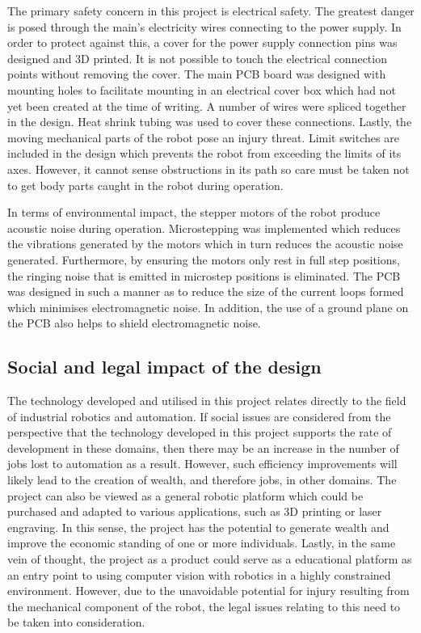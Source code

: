 The primary safety concern in this project is electrical safety. The greatest danger is posed through the main's electricity wires connecting to the power supply. In order to protect against this, a cover for the power supply connection pins was designed and 3D printed. It is not possible to touch the electrical connection points without removing the cover. The main PCB board was designed with mounting holes to facilitate mounting in an electrical cover box which had not yet been created at the time of writing. A number of wires were spliced together in the design. Heat shrink tubing was used to cover these connections. Lastly, the moving mechanical parts of the robot pose an injury threat. Limit switches are included in the design which prevents the robot from exceeding the limits of its axes. However, it cannot sense obstructions in its path so care must be taken not to get body parts caught in the robot during operation.

In terms of environmental impact, the stepper motors of the robot produce acoustic noise during operation. Microstepping was implemented which reduces the vibrations generated by the motors which in turn reduces the acoustic noise generated. Furthermore, by ensuring the motors only rest in full step positions, the ringing noise that is emitted in microstep positions is eliminated. The PCB was designed in such a manner as to reduce the size of the current loops formed which minimises electromagnetic noise. In addition, the use of a ground plane on the PCB also helps to shield electromagnetic noise.

\subsection{Social and legal impact of the design}

The technology developed and utilised in this project relates directly to the field of industrial robotics and automation. If social issues are considered from the perspective that the technology developed in this project supports the rate of development in these domains, then there may be an increase in the number of jobs lost to automation as a result. However, such efficiency improvements will likely lead to the creation of wealth, and therefore jobs, in other domains. The project can also be viewed as a general robotic platform which could be purchased and adapted to various applications, such as 3D printing or laser engraving. In this sense, the project has the potential to generate wealth and improve the economic standing of one or more individuals. Lastly, in the same vein of thought, the project as a product could serve as a educational platform as an entry point to using computer vision with robotics in a highly constrained environment. However, due to the unavoidable potential for injury resulting from the mechanical component of the robot, the legal issues relating to this need to be taken into consideration.



\newpage



